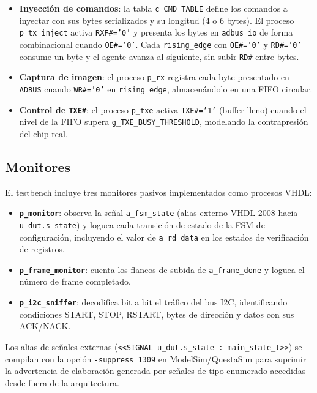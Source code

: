 \documentclass[../main.tex]{subfiles}
\begin{document}
\begin{itemize}
    \item \textbf{Inyección de comandos}: la tabla \texttt{c\_CMD\_TABLE} define los comandos a inyectar con sus bytes serializados y su longitud (4 o 6 bytes). El proceso \texttt{p\_tx\_inject} activa \texttt{RXF\#='0'} y presenta los bytes en \texttt{adbus\_io} de forma combinacional cuando \texttt{OE\#='0'}. Cada \texttt{rising\_edge} con \texttt{OE\#='0'} y \texttt{RD\#='0'} consume un byte y el agente avanza al siguiente, sin subir \texttt{RD\#} entre bytes.
    \item \textbf{Captura de imagen}: el proceso \texttt{p\_rx} registra cada byte presentado en \texttt{ADBUS} cuando \texttt{WR\#='0'} en \texttt{rising\_edge}, almacenándolo en una FIFO circular.
    \item \textbf{Control de \texttt{TXE\#}}: el proceso \texttt{p\_txe} activa \texttt{TXE\#='1'} (buffer lleno) cuando el nivel de la FIFO supera \texttt{g\_TXE\_BUSY\_THRESHOLD}, modelando la contrapresión del chip real.
\end{itemize}

\subsection{Monitores}

El testbench incluye tres monitores pasivos implementados como procesos VHDL:

\begin{itemize}
    \item \textbf{\texttt{p\_monitor}}: observa la señal \texttt{a\_fsm\_state} (alias externo VHDL-2008 hacia \texttt{u\_dut.s\_state}) y loguea cada transición de estado de la FSM de configuración, incluyendo el valor de \texttt{a\_rd\_data} en los estados de verificación de registros.
    \item \textbf{\texttt{p\_frame\_monitor}}: cuenta los flancos de subida de \texttt{a\_frame\_done} y loguea el número de frame completado.
    \item \textbf{\texttt{p\_i2c\_sniffer}}: decodifica bit a bit el tráfico del bus I2C, identificando condiciones START, STOP, RSTART, bytes de dirección y datos con sus ACK/NACK.
\end{itemize}

Los alias de señales externas (\texttt{<<SIGNAL u\_dut.s\_state : main\_state\_t>>}) se compilan con la opción \texttt{-suppress 1309} en ModelSim/QuestaSim para suprimir la advertencia de elaboración generada por señales de tipo enumerado accedidas desde fuera de la arquitectura.
\end{document}
